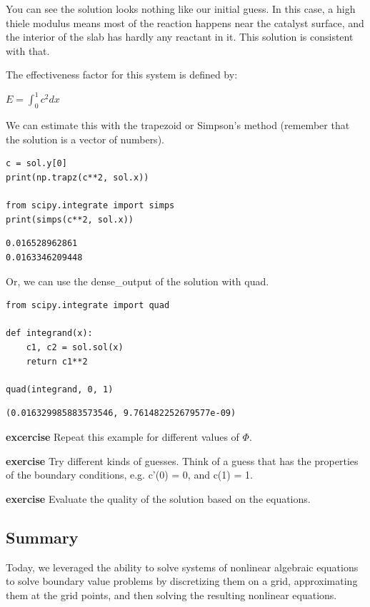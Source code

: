 \documentclass[11pt]{article}
\begin{document}
You can see the solution looks nothing like our initial guess. In this case, a high thiele modulus means most of the reaction happens near the catalyst surface, and the interior of the slab has hardly any reactant in it. This solution is consistent with that.


The effectiveness factor for this system is defined by:

\(E = \int_0^1 c^2 dx\)

We can estimate this with the trapezoid or Simpson's method (remember that the solution is a vector of numbers).

\begin{verbatim}
c = sol.y[0]
print(np.trapz(c**2, sol.x))

from scipy.integrate import simps
print(simps(c**2, sol.x))
\end{verbatim}

\begin{verbatim}
0.016528962861
0.0163346209448

\end{verbatim}

Or, we can use the dense\_output of the solution with quad.

\begin{verbatim}
from scipy.integrate import quad

def integrand(x):
    c1, c2 = sol.sol(x)
    return c1**2

quad(integrand, 0, 1)
\end{verbatim}

\begin{verbatim}
(0.016329985883573546, 9.761482252679577e-09)
\end{verbatim}


\textbf{excercise} Repeat this example for different values of \(\Phi\).

\textbf{exercise} Try different kinds of guesses. Think of a guess that has the properties of the boundary conditions, e.g. c'(0) = 0, and c(1) = 1.

\textbf{exercise} Evaluate the quality of the solution based on the equations.

\subsection{Summary}
\label{sec:org6e14048}

Today, we leveraged the ability to solve systems of nonlinear algebraic equations to solve boundary value problems by discretizing them on a grid, approximating them at the grid points, and then solving the resulting nonlinear equations.
\end{document}

